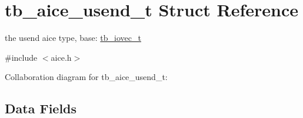 \hypertarget{structtb__aice__usend__t}{\section{tb\-\_\-aice\-\_\-usend\-\_\-t Struct Reference}
\label{structtb__aice__usend__t}
}


the usend aice type, base\-: \hyperlink{structtb__iovec__t}{tb\-\_\-iovec\-\_\-t}  




{\ttfamily \#include $<$aice.\-h$>$}



Collaboration diagram for tb\-\_\-aice\-\_\-usend\-\_\-t\-:
\subsection*{Data Fields}
